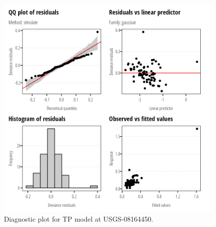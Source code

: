 \documentclass[
]{article}
\begin{document}
\clearpage

\begin{figure}[h]

{\centering \includegraphics{model_assessment_files/figure-pdf/unnamed-chunk-34-1.png}

}

\caption{Diagnostic plot for TP model at USGS-08164450.}

\end{figure}
\end{document}
